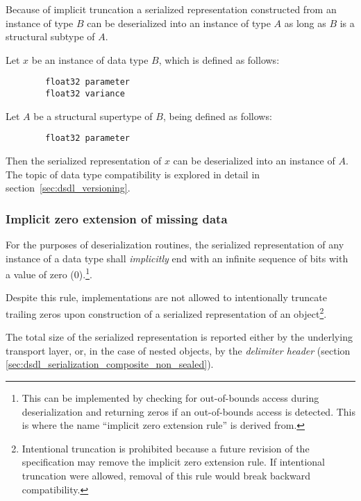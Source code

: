 \begin{remark}
    Because of implicit truncation a serialized representation constructed from an instance of type $B$ can be
    deserialized into an instance of type $A$ as long as $B$ is a structural subtype of $A$.

    Let $x$ be an instance of data type $B$, which is defined as follows:

    \begin{verbatim}
        float32 parameter
        float32 variance
    \end{verbatim}

    Let $A$ be a structural supertype of $B$, being defined as follows:

    \begin{verbatim}
        float32 parameter
    \end{verbatim}

    Then the serialized representation of $x$ can be deserialized into an instance of $A$.
    The topic of data type compatibility is explored in detail in section~\ref{sec:dsdl_versioning}.
\end{remark}

\subsubsection{Implicit zero extension of missing data}\label{sec:dsdl_serialization_implicit_zero_extension}

For the purposes of deserialization routines,
the serialized representation of any instance of a data type shall \emph{implicitly} end with an
infinite sequence of bits with a value of zero (0).\footnote{%
    This can be implemented by checking for out-of-bounds access during deserialization and returning zeros
    if an out-of-bounds access is detected. This is where the name ``implicit zero extension rule'' is derived
    from.
}.

Despite this rule, implementations are not allowed to intentionally truncate trailing zeros
upon construction of a serialized representation of an object\footnote{%
    Intentional truncation is prohibited because a future revision of the specification may remove the implicit zero
    extension rule.
    If intentional truncation were allowed, removal of this rule would break backward compatibility.
}.

The total size of the serialized representation is reported either by the underlying transport layer, or,
in the case of nested objects, by the \emph{delimiter header}
(section \ref{sec:dsdl_serialization_composite_non_sealed}).

